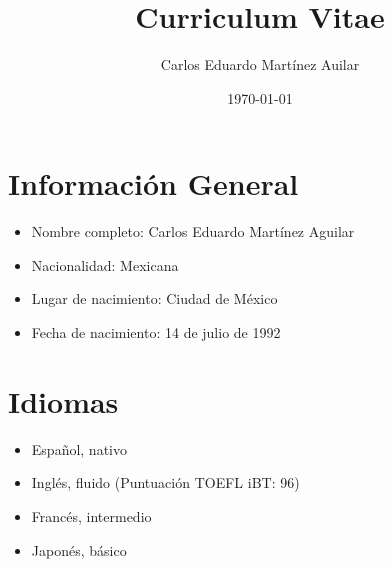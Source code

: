 \documentclass[11pt]{article}
\author{Carlos Eduardo Martínez Auilar}
\date{\today}
\title{Curriculum Vitae}
\begin{document}

\makecvheader

\section{Información General}
\label{sec:orgaf62938}
\begin{itemize}
\item Nombre completo: Carlos Eduardo Martínez Aguilar
\item Nacionalidad: Mexicana
\item Lugar de nacimiento: Ciudad de México
\item Fecha de nacimiento: 14 de julio de 1992
\end{itemize}
\section{Idiomas}
\label{sec:org3d75503}
\begin{itemize}
\item Español, nativo
\item Inglés, fluido (Puntuación TOEFL iBT: 96)
\item Francés, intermedio
\item Japonés, básico
\end{itemize}
\end{document}
